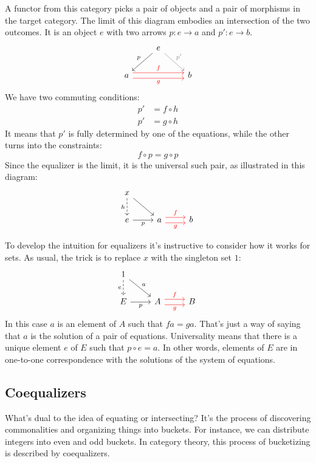 \documentclass[DaoFP]{subfiles}
\begin{document}
A functor from this category picks a pair of objects and a pair of morphisms in the target category. The limit of this diagram embodies an intersection of the two outcomes. It is an object $e$ with two arrows $p \colon e \to a$ and $p' \colon e \to b$.
\[
\begin{tikzcd}
& e
\arrow[dl, "p"']
\arrow[dr, gray, "p'"]
\\
a 
\arrow[rr, red, shift left=.75ex, "f"]
\arrow[rr, red, shift right=.75ex, "g"']
&&
b
\end{tikzcd}
\]
We have two commuting conditions:
\begin{align*}
p' &= f \circ h \\
p' &= g \circ h
\end{align*}
It means that $p'$ is fully determined by one of the equations, while the other turns into the constraints:
\[ f \circ p = g \circ p \]
Since the equalizer is the limit, it is the universal such pair, as illustrated in this diagram:
\[
\begin{tikzcd}
x
\arrow[d, dashed, "h"']
\arrow[dr, ""]
\\
e
\arrow[r, "p"']
&
a \arrow[r, red, shift left=0.75ex, "f"]
  \arrow[r, red, shift right=0.75ex, "g"']
&
b
\end{tikzcd}
\]

To develop the intuition for equalizers it's instructive to consider how it works for sets. As usual, the trick is to replace $x$ with the singleton set $1$:
\[
\begin{tikzcd}
1
\arrow[d, dashed, "e"']
\arrow[dr, "a"]
\\
E
\arrow[r, "p"']
&
A \arrow[r, red, shift left=0.75ex, "f"]
  \arrow[r, red, shift right=0.75ex, "g"']
&
B
\end{tikzcd}
\]
In this case $a$ is an element of $A$ such that $f a = g a$. That's just a way of saying that $a$ is the solution of a pair of equations. Universality means that there is a unique element $e$ of $E$ such that $p \circ e = a$. In other words, elements of $E$ are in one-to-one correspondence with the solutions of the system of equations. 

\subsection{Coequalizers}

What's dual to the idea of equating or intersecting? It's the process of discovering commonalities and organizing things into buckets. For instance, we can distribute integers into even and odd buckets. In category theory, this process of bucketizing is described by coequalizers.
\end{document}
